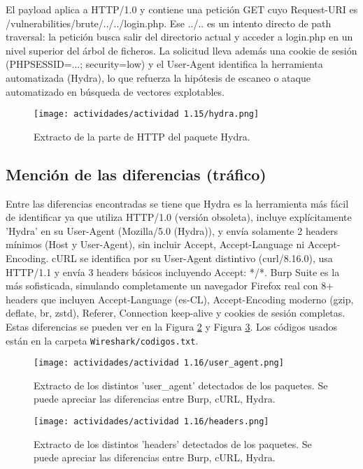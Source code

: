 \documentclass[letter,12pt]{article}
\begin{document}
El payload aplica a HTTP/1.0 y contiene una petición GET cuyo Request-URI es /vulnerabilities/brute/../../login.php. Ese ../.. es un intento directo de path traversal: la petición busca salir del directorio actual y acceder a login.php en un nivel superior del árbol de ficheros. La solicitud lleva además una cookie de sesión (PHPSESSID=...; security=low) y el User‑Agent identifica la herramienta automatizada (Hydra), lo que refuerza la hipótesis de escaneo o ataque automatizado en búsqueda de vectores explotables.

\begin{figure}[H]
    \centering
    \texttt{[image: actividades/actividad 1.15/hydra.png]}
    \caption{Extracto de la parte de HTTP del paquete Hydra.}
    \label{actividad 1.15 hydra}
\end{figure}

\subsection{Mención de las diferencias (tráfico)}
Entre las diferencias encontradas se tiene que Hydra es la herramienta más fácil de identificar ya que utiliza HTTP/1.0 (versión obsoleta), incluye explícitamente 'Hydra' en su User-Agent (Mozilla/5.0 (Hydra)), y envía solamente 2 headers mínimos (Host y User-Agent), sin incluir Accept, Accept-Language ni Accept-Encoding. cURL se identifica por su User-Agent distintivo (curl/8.16.0), usa HTTP/1.1 y envía 3 headers básicos incluyendo Accept: */*. Burp Suite es la más sofisticada, simulando completamente un navegador Firefox real con 8+ headers que incluyen Accept-Language (es-CL), Accept-Encoding moderno (gzip, deflate, br, zstd), Referer, Connection keep-alive y cookies de sesión completas. Estas diferencias se pueden ver en la Figura \ref{actividad 1.16 user_agent} y Figura \ref{actividad 1.16 headers}. Los códigos usados están en la carpeta \verb|Wireshark/codigos.txt|.

\begin{figure}[H]
    \centering
    \texttt{[image: actividades/actividad 1.16/user\_agent.png]}
    \caption{Extracto de los distintos 'user\_agent' detectados de los paquetes. Se puede apreciar las diferencias entre Burp, cURL, Hydra.}
    \label{actividad 1.16 user_agent}
\end{figure}

\begin{figure}[H]
    \centering
    \texttt{[image: actividades/actividad 1.16/headers.png]}
    \caption{Extracto de los distintos 'headers' detectados de los paquetes. Se puede apreciar las diferencias entre Burp, cURL, Hydra.}
    \label{actividad 1.16 headers}
\end{figure}
\end{document}
